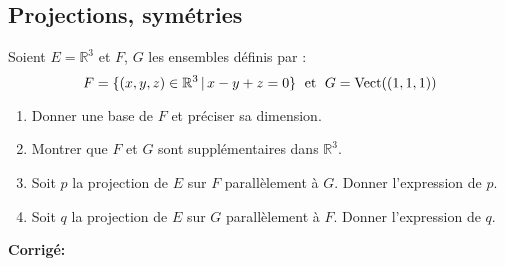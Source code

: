 \documentclass[a4paper,twoside,french,11pt]{VcCours}
\newcommand{\corr}{\textbf{Corrigé:}}
\begin{document}
\subsection{\large Projections, symétries}




\begin{Exercice}{} Soient $E= \mathbb{R}^3$ et $F$, $G$ les ensembles définis par :
$$ F = \lbrace (x,y,z) \in \mathbb{R}^3 \, \vert \, x-y+z=0 \rbrace \; \hbox{ et }  \; G = \textrm{Vect}((1,1,1)) $$

\begin{enumerate}
\item Donner une base de $F$ et préciser sa dimension.
\item Montrer que $F$ et $G$ sont supplémentaires dans $\mathbb{R}^3$.
\item Soit $p$ la projection de $E$ sur $F$ parallèlement à $G$. Donner l'expression de $p$.
\item Soit $q$ la projection de $E$ sur $G$ parallèlement à $F$. Donner l'expression de $q$.
\end{enumerate}
\end{Exercice}

\corr  
\end{document}

